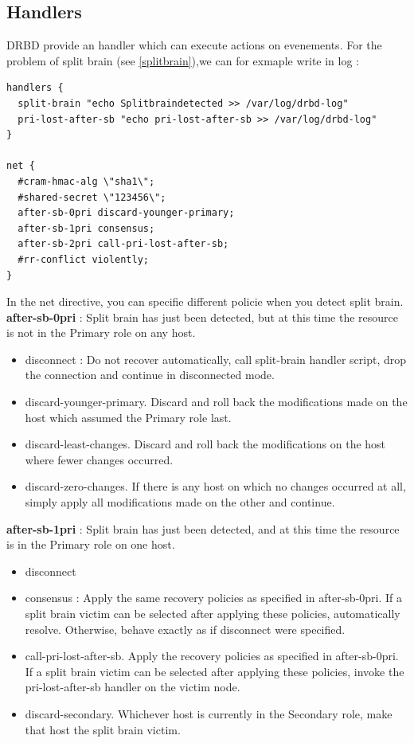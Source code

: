 \documentclass[a4paper,10pt]{report}
\begin{document}
\subsection{Handlers}
DRBD provide an handler which can execute actions on evenements. For the problem of split brain (see \ref{splitbrain}),we can for exmaple write in log :
\begin{lstlisting}
handlers {
  split-brain "echo Splitbraindetected >> /var/log/drbd-log"
  pri-lost-after-sb "echo pri-lost-after-sb >> /var/log/drbd-log"
}

net {
  #cram-hmac-alg \"sha1\";
  #shared-secret \"123456\";
  after-sb-0pri discard-younger-primary;
  after-sb-1pri consensus;
  after-sb-2pri call-pri-lost-after-sb;
  #rr-conflict violently;
}
\end{lstlisting}
In the net directive, you can specifie different policie when you detect split brain.\\
\textbf{after-sb-0pri} : Split brain has just been detected, but at this time the resource is not in the Primary role on any host.
\begin{itemize}
\item disconnect : Do not recover automatically, call split-brain handler script, drop the connection and continue in disconnected mode.
\item discard-younger-primary. Discard and roll back the modifications made on the host which assumed the Primary role last.
\item discard-least-changes. Discard and roll back the modifications on the host where fewer changes occurred.
\item discard-zero-changes. If there is any host on which no changes occurred at all, simply apply all modifications made on the other and continue.
\end{itemize}
\textbf{after-sb-1pri} : Split brain has just been detected, and at this time the resource is in the Primary role on one host.
\begin{itemize}
\item disconnect 
\item consensus : Apply the same recovery policies as specified in after-sb-0pri. If a split brain victim can be selected after applying these policies, automatically resolve. Otherwise, behave exactly as if disconnect were specified.
\item call-pri-lost-after-sb. Apply the recovery policies as specified in after-sb-0pri. If a split brain victim can be selected after applying these policies, invoke the pri-lost-after-sb handler on the victim node.
\item discard-secondary. Whichever host is currently in the Secondary role, make that host the split brain victim.
\end{itemize}
\end{document}
